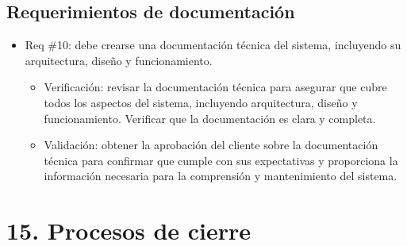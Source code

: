 \documentclass[
11pt, %
codirector, %
]{charter}
\begin{document}
\subsection{Requerimientos de documentación}

\begin{itemize}
\item Req \#10: debe crearse una documentación técnica del sistema, incluyendo su arquitectura, diseño y funcionamiento.

\begin{itemize}
	\item Verificación: revisar la documentación técnica para asegurar que cubre todos los aspectos del sistema, incluyendo arquitectura, diseño y funcionamiento. Verificar que la documentación es clara y completa.
	\item Validación: obtener la aprobación del cliente sobre la documentación técnica para confirmar que cumple con sus expectativas y proporciona la información necesaria para la comprensión y mantenimiento del sistema.
\end{itemize}
\end{itemize}


\section{15. Procesos de cierre}    
\label{sec:cierre}
\end{document}
